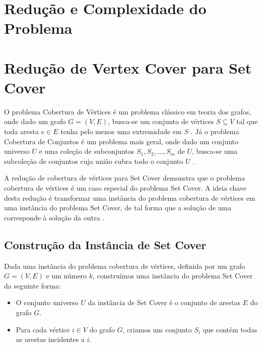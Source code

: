 \documentclass[12pt, a4paper]{report}
\begin{document}
\section{Redução e Complexidade do Problema}

\section*{Redução de Vertex Cover para Set Cover}

O problema Cobertura de Vértices é um problema clássico em teoria dos grafos, onde dado um grafo \(G = (V, E)\), busca-se um conjunto de vértices \(S \subseteq V\) tal que toda aresta \(e \in E\) tenha pelo menos uma extremidade em \(S\) 
\cite{kleinberg2006algorithm}. Já o problema Cobertura de Conjuntos é um problema mais geral, onde dado um conjunto universo \(U\) e uma coleção de subconjuntos \(S_1, S_2, \dots, S_m\) de \(U\), busca-se uma subcoleção de conjuntos cuja união cubra todo o conjunto \(U\) \cite{kleinberg2006algorithm}.

A redução de cobertura de vértices para Set Cover demonstra que o problema cobertura de vértices é um caso especial do problema Set Cover. A ideia chave desta redução é transformar uma instância do problema cobertura de vértices em uma instância do problema Set Cover, de tal forma que a solução de uma corresponde à solução da outra \cite{kleinberg2006algorithm}.

\subsection*{Construção da Instância de Set Cover}
Dada uma instância do problema cobertura de vértices, definida por um grafo \(G = (V, E)\) e um número \(k\), construímos uma instância do problema Set Cover da seguinte forma:
\begin{itemize}
    \item O conjunto universo \(U\) da instância de Set Cover é o conjunto de arestas \(E\) do grafo \(G\).
    \item Para cada vértice \(i \in V\) do grafo \(G\), criamos um conjunto \(S_i\) que contém todas as arestas incidentes a \(i\).
\end{itemize}
\end{document}
